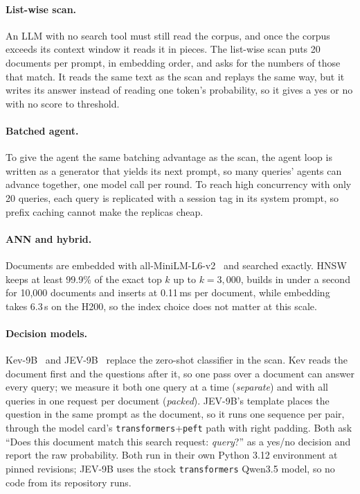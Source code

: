 \documentclass[11pt]{article}
\begin{document}
\paragraph{List-wise scan.}
An LLM with no search tool must still read the corpus, and once the corpus
exceeds its context window it reads it in pieces. The list-wise scan puts 20
documents per prompt, in embedding order, and asks for the numbers of those that
match. It reads the same text as the scan and replays the same way, but it
writes its answer instead of reading one token's probability, so it gives a
yes or no with no score to threshold.

\paragraph{Batched agent.}
To give the agent the same batching advantage as the scan, the agent loop is
written as a generator that yields its next prompt, so many queries' agents
can advance together, one model call per round. To reach high concurrency
with only 20 queries, each query is replicated with a session tag in its
system prompt, so prefix caching cannot make the replicas cheap.

\paragraph{ANN and hybrid.}
Documents are embedded with all-MiniLM-L6-v2~\cite{reimers2019sbert} and
searched exactly. HNSW~\cite{malkov2020hnsw} keeps at least 99.9\% of the exact
top $k$ up to $k=3{,}000$, builds in under a second for 10,000 documents and
inserts at 0.11\,ms per document, while embedding takes 6.3\,s on the H200, so
the index choice does not matter at this scale.

\paragraph{Decision models.}
Kev-9B~\cite{kev} and JEV-9B~\cite{jev9b} replace the zero-shot classifier
in the scan. Kev reads the document first and the questions after it, so one
pass over a document can answer every query; we measure it both one query at
a time (\emph{separate}) and with all queries in one request per document
(\emph{packed}). JEV-9B's template places the question in the same prompt as
the document, so it runs one sequence per pair, through the model card's
\texttt{transformers}+\texttt{peft} path with right padding. Both ask
``Does this document match this search request: \emph{query}?'' as a yes/no
decision and report the raw probability. Both run in their own Python 3.12
environment at pinned revisions; JEV-9B uses the stock \texttt{transformers}
Qwen3.5 model, so no code from its repository runs.
\end{document}
